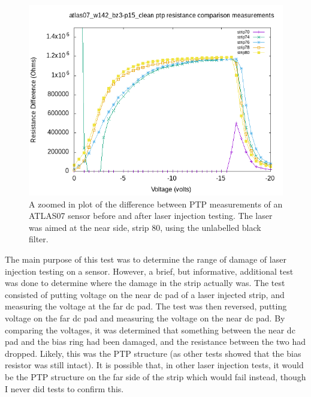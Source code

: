 \documentclass{report}
\begin{document}
            \begin{figure}[h] 
                \includegraphics[height=.4\textheight]{atlas07_w142_bz3-p15_clean_resistance_comparison_plots_zoom}
                \centering
                \caption{ A zoomed in plot of the difference between PTP measurements of an ATLAS07 sensor before and after laser injection testing. The laser was aimed at the near side, strip 80, using the unlabelled black filter. }
                \label{fig:atlas07_w142_bz3-p15_clean_resistance_comparison_plots_zoom}
            \end{figure}
            
            The main purpose of this test was to determine the range of damage of laser injection testing on a sensor. However, a brief, but informative, additional test was done to determine where the damage in the strip actually was. The test consisted of putting voltage on the near dc pad of a laser injected strip, and measuring the voltage at the far dc pad. The test was then reversed, putting voltage on the far dc pad and measuring the voltage on the near dc pad. By comparing the voltages, it was determined that something between the near dc pad and the bias ring had been damaged, and the resistance between the two had dropped. Likely, this was the PTP structure (as other tests showed that the bias resistor was still intact). It is possible that, in other laser injection tests, it would be the PTP structure on the far side of the strip which would fail instead, though I never did tests to confirm this.
\end{document}

